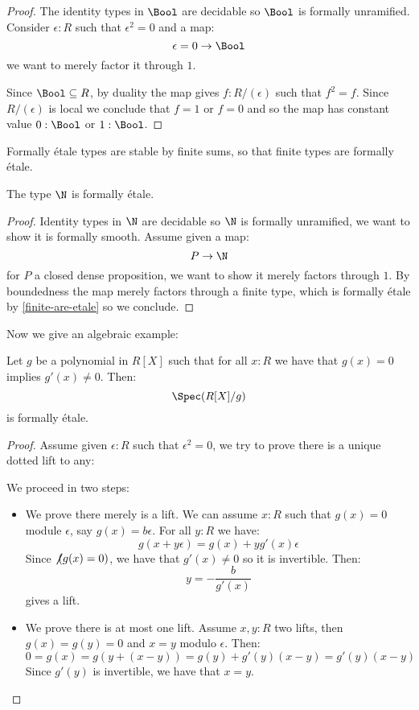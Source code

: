 \begin{proof}
The identity types in $\Bool$ are decidable so $\Bool$ is formally unramified. Consider $\epsilon:R$ such that $\epsilon^2=0$ and a map:
\[\epsilon=0 \to \Bool\]
we want to merely factor it through $1$.

 Since $\Bool\subseteq R$, by duality the map gives $f:R/(\epsilon)$ such that $f^2=f$. Since $R/(\epsilon)$ is local we conclude that $f = 1$ or $f=0$ and so the map has constant value $0:\Bool$ or $1:\Bool$.
\end{proof}

\begin{corollary}\label{finite-are-etale}
Formally étale types are stable by finite sums, so that finite types are formally étale.
\end{corollary}

\begin{proposition}
The type $\N$ is formally étale.
\end{proposition}

\begin{proof}
Identity types in $\N$ are decidable so $\N$ is formally unramified, we want to show it is formally smooth. Assume given a map:
\[P\to \N\]
for $P$ a closed dense proposition, we want to show it merely factors through $1$. By boundedness the map merely factors through a finite type, which is formally étale by \cref{finite-are-etale} so we conclude.
\end{proof}

Now we give an algebraic example:

\begin{proposition}
Let $g$ be a polynomial in $R[X]$ such that for all $x:R$ we have that $g(x)=0$ implies $g'(x)\not=0$. Then:
\[\Spec(R[X]/g)\]
is formally étale.
\end{proposition}

\begin{proof}
Assume given $\epsilon:R$ such that $\epsilon^2=0$, we try to prove there is a unique dotted lift to any:
    \begin{center}
    \end{center}
We proceed in two steps:
\begin{itemize}
\item We prove there merely is a lift. We can assume $x:R$ such that $g(x)=0$ module $\epsilon$, say $g(x)=b\epsilon$. For all $y:R$ we have:
\[g(x+y\epsilon) = g(x)+ y g'(x) \epsilon\]
Since $\not\not(g(x)=0)$, we have that $g'(x)\not=0$ so it is invertible. Then: 
\[y=-\frac{b}{g'(x)}\]
gives a lift.
\item We prove there is at most one lift. Assume $x,y:R$ two lifts, then $g(x)=g(y)=0$ and $x=y$ modulo $\epsilon$. Then:
\[0 = g(x) = g(y + (x - y)) = g(y) + g'(y) (x-y) = g'(y) (x- y)\]
Since $g'(y)$ is invertible, we have that $x=y$.
\end{itemize}
\end{proof}

